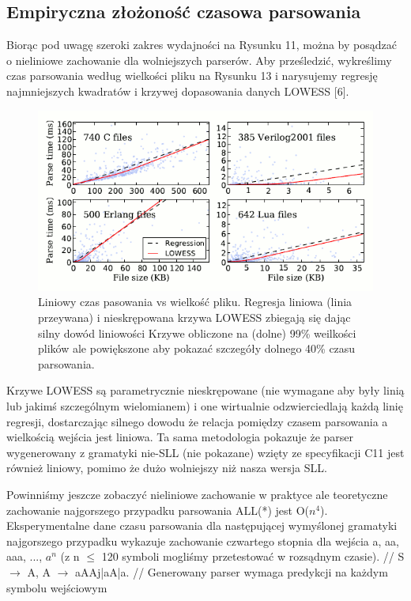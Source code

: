 ﻿\subsection{Empiryczna złożoność czasowa parsowania}
Biorąc pod uwagę szeroki zakres wydajności na Rysunku 11, można by posądzać o nieliniowe
zachowanie dla wolniejszych parserów. Aby prześledzić, wykreślimy czas parsowania według
wielkości pliku na Rysunku 13 i narysujemy regresję najmniejszych kwadratów
i krzywej dopasowania danych LOWESS [6].
\begin{figure}[h]
\includegraphics[scale=0.67]{Figure13.png}
\caption{
Liniowy czas pasowania vs wielkość pliku. Regresja liniowa (linia przeywana)
i nieskrępowana krzywa LOWESS zbiegają się dając silny dowód liniowości
Krzywe obliczone na (dolne) 99\% weilkości plików ale powiększone
aby pokazać szczegóły dolnego 40\% czasu parsowania.
}
\end{figure}
Krzywe LOWESS są parametrycznie nieskrępowane (nie wymagane aby były linią lub
jakimś szczególnym wielomianem) i one wirtualnie odzwierciedlają każdą
linię regresji, dostarczając silnego dowodu że relacja
pomiędzy czasem parsowania a wielkością wejścia jest liniowa.
Ta sama metodologia pokazuje że parser wygenerowany z gramatyki nie-SLL (nie pokazane)
wzięty ze specyfikacji C11 jest również liniowy, pomimo że dużo wolniejszy niż nasza wersja SLL.
\par
Powinniśmy jeszcze zobaczyć nieliniowe zachowanie w praktyce ale teoretyczne
zachowanie najgorszego przypadku parsowania ALL(*) jest O($n^4$). Eksperymentalne
dane czasu parsowania dla następującej wymyślonej gramatyki najgorszego przypadku
wykazuje zachowanie czwartego stopnia dla wejścia a, aa, aaa,
..., $a^n$ (z n $\leqslant$ 120 symboli mogliśmy przetestować w rozsądnym czasie).
//
S $\rightarrow$ A, A $\rightarrow$ aAAj|aA|a.
//
Generowany parser wymaga predykcji na każdym symbolu wejściowym
